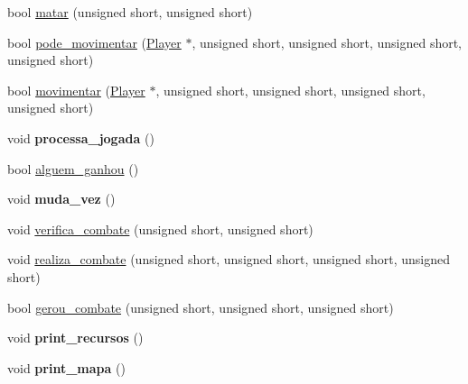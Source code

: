 \begin{DoxyCompactItemize}
\item 
bool \mbox{\hyperlink{class_controlador_a2455948558b79285060dbd2dd8d15bf1}{matar}} (unsigned short, unsigned short)
\item 
bool \mbox{\hyperlink{class_controlador_a75328c4987fa242b36531edac623ff3e}{pode\+\_\+movimentar}} (\mbox{\hyperlink{class_player}{Player}} $\ast$, unsigned short, unsigned short, unsigned short, unsigned short)
\item 
bool \mbox{\hyperlink{class_controlador_a928e6fc0f6cad97f68b4536a802f82bc}{movimentar}} (\mbox{\hyperlink{class_player}{Player}} $\ast$, unsigned short, unsigned short, unsigned short, unsigned short)
\item 
\mbox{\label{class_controlador_aa91bbe914a404ef60a4cdef6cf7af4e6}} 
void {\bfseries processa\+\_\+jogada} ()
\item 
bool \mbox{\hyperlink{class_controlador_ad7e1f4e5dc199d9499cf1896c3f4fdf1}{alguem\+\_\+ganhou}} ()
\item 
\mbox{\label{class_controlador_a55cb7c5d39b6218e62e61fe6a70b6ae3}} 
void {\bfseries muda\+\_\+vez} ()
\item 
void \mbox{\hyperlink{class_controlador_ad836b4790965ddd4b654a42235b8267e}{verifica\+\_\+combate}} (unsigned short, unsigned short)
\item 
void \mbox{\hyperlink{class_controlador_a3f130df13f0c24605a3e34c3edbd2959}{realiza\+\_\+combate}} (unsigned short, unsigned short, unsigned short, unsigned short)
\item 
bool \mbox{\hyperlink{class_controlador_a331d668f08fc4946d79d3742978ef481}{gerou\+\_\+combate}} (unsigned short, unsigned short, unsigned short)
\item 
\mbox{\label{class_controlador_a31986f0934c1b40dce19ef1bfbba5cbc}} 
void {\bfseries print\+\_\+recursos} ()
\item 
\mbox{\label{class_controlador_a9190ea722291cb46b8f30024c1cd10af}} 
void {\bfseries print\+\_\+mapa} ()
\end{DoxyCompactItemize}
